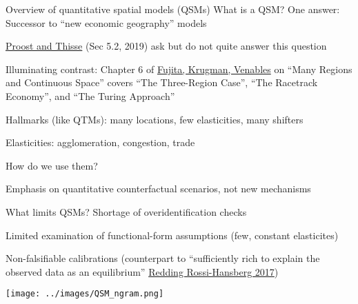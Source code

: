 \documentclass[11pt,notes=hide,aspectratio=169]{beamer}
\begin{document}
\begin{frame}{Overview of quantitative spatial models (QSMs)}
What is a QSM? One answer: Successor to ``new economic geography'' models
\begin{itemize}{\small
\item \href{https://www.aeaweb.org/articles?id=10.1257/jel.20181414}{Proost and Thisse} (Sec 5.2, 2019) ask but do not quite answer this question
\item Illuminating contrast: Chapter 6 of \href{https://direct.mit.edu/books/book/2525/The-Spatial-EconomyCities-Regions-and}{Fujita, Krugman, Venables} on 
``Many Regions and Continuous Space'' covers ``The Three-Region Case'', ``The Racetrack Economy'', and ``The Turing Approach''
\item Hallmarks (like QTMs): many locations, few elasticities, many shifters
\item Elasticities: agglomeration, congestion, trade
}\end{itemize}
How do we use them?
\begin{itemize}{\small
\item Emphasis on quantitative counterfactual scenarios, not new mechanisms
}\end{itemize}
What limits QSMs? Shortage of overidentification checks
\begin{itemize}{\small
\item Limited examination of functional-form assumptions (few, constant elasticites)
\item Non-falsifiable calibrations (counterpart to ``sufficiently rich to explain the observed data as an equilibrium'' \href{https://doi.org/10.1146/annurev-economics-063016-103713}{Redding Rossi-Hansberg 2017})
}\end{itemize}
\end{frame}
\begin{frame}[plain]
\begin{center}
\texttt{[image: ../images/QSM\_ngram.png]}
\end{center}
\end{frame}
\end{document}
